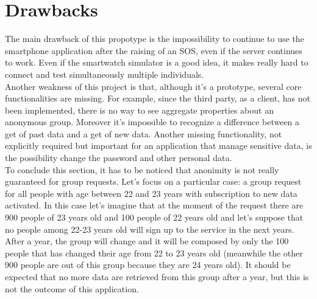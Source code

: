 \section{Drawbacks}
The main drawback of this propotype is the impossibility to continue to use the smartphone application after the raising of an SOS, even if the server continues to work. Even if the smartwatch simulator is a good idea, it makes really hard to connect and test simultaneously multiple individuals.\\
Another weakness of this project is that, although it's a prototype, several core functionalities are missing. For example, since the third party, as a client, has not been implemented, there is no way to see aggregate properties about an anonymous group. 
Moreover it's impossible to recognize a difference between a get of past data and a get of new data. Another missing functionality, not explicitly required but important for an application that manage sensitive data, is the possibility change the password and other personal data.\\
To conclude this section, it has to be noticed that anonimity is not really guaranteed for group requests. Let's focus on a particular case: a group request for all people with age between 22 and 23 years with subscription to new data activated. In this case let's imagine that at the moment of the request there are 900 people of 23 years old and 100 people of 22 years old and let's suppose that no people among 22-23 years old will sign up to the service in the next years. After a year, the group will change and it will be composed by only the 100 people that has changed their age from 22 to 23 years old (meanwhile the other 900 people are out of this group because they are 24 years old). It should be expected that no more data are retrieved from this group after a year, but this is not the outcome of this application.
